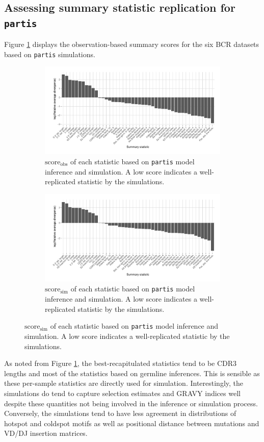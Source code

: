 \documentclass{article}
\begin{document}
\subsection*{Assessing summary statistic replication for \texttt{partis}}
Figure \ref{fig:ObsScoresBCR} displays the observation-based summary scores for the six BCR datasets based on \texttt{partis} simulations.
\begin{figure}
	\begin{subfigure}{\textwidth}
    	\includegraphics[width=\linewidth]{Figures/PartisScores/obs_score_plot.pdf}
    	\caption{$\text{score}_\text{obs}$ of each statistic based on \texttt{partis} model inference and simulation.
     	   A low score indicates a well-replicated statistic by the simulations.
    	}
    	\label{fig:ObsScoresBCR}
	\end{subfigure}
	\begin{subfigure}{\textwidth}
    	\includegraphics[width=\linewidth]{Figures/PartisScores/sim_score_plot.pdf}
    	\caption{$\text{score}_\text{sim}$ of each statistic based on \texttt{partis} model inference and simulation.
    	    A low score indicates a well-replicated statistic by the simulations.
    	}
    	\label{fig:SimScoresBCR}
	\end{subfigure}
\end{figure}
As noted from Figure \ref{fig:ObsScoresBCR}, the best-recapitulated statistics tend to be CDR3 lengths and most of the statistics based on germline inferences.
This is sensible as these per-sample statistics are directly used for simulation.
Interestingly, the simulations do tend to capture selection estimates and GRAVY indices well despite these quantities not being involved in the inference or simulation process.
Conversely, the simulations tend to have less agreement in distributions of hotspot and coldspot motifs as well as positional distance between mutations and VD/DJ insertion matrices.
\end{document}
